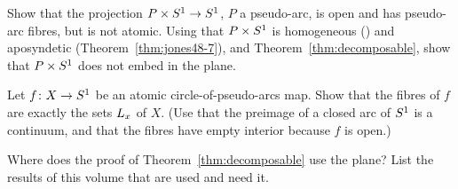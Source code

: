 \begin{exercise}
Show that the projection $P\times S^1\to S^1$, $P$ a pseudo-arc, is open and has pseudo-arc fibres, but is not atomic. Using that $P\times S^1$ is homogeneous
() and aposyndetic (Theorem~\ref{thm:jones48-7}), and Theorem~\ref{thm:decomposable}, show that $P\times S^1$ does not embed in the plane.
\end{exercise}

\begin{exercise}
Let $f\colon X\to S^1$ be an atomic circle-of-pseudo-arcs map. Show that the fibres of $f$ are exactly the sets $L_{x}$ of $X$. (Use that
the preimage of a closed arc of $S^1$ is a continuum, and that the fibres have empty interior because $f$ is open.)
\end{exercise}

\begin{exercise}
Where does the proof of Theorem~\ref{thm:decomposable} use the plane? List the results of this volume that are used and need it.
\end{exercise}
